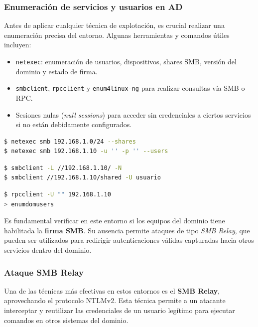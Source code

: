 \documentclass[a4paper, 11pt]{article}
\begin{document}
\subsubsection*{Enumeración de servicios y usuarios en AD}

Antes de aplicar cualquier técnica de explotación, es crucial realizar una enumeración precisa del entorno. Algunas herramientas y comandos útiles incluyen:

\begin{itemize}
\item \texttt{netexec}: enumeración de usuarios, dispositivos, shares SMB, versión del dominio y estado de firma.
\item \texttt{smbclient}, \texttt{rpcclient} y \texttt{enum4linux-ng} para realizar consultas vía SMB o RPC.
\item Sesiones nulas (\textit{null sessions}) para acceder sin credenciales a ciertos servicios si no están debidamente configurados.
\end{itemize}

\begin{lstlisting}[language=bash, style=terminalstyle, caption=Enumeración de recursos SMB con NetExec]
$ netexec smb 192.168.1.0/24 --shares
$ netexec smb 192.168.1.10 -u '' -p '' --users
\end{lstlisting}

\begin{lstlisting}[language=bash, style=terminalstyle, caption=Acceso a recursos compartidos SMB con smbclient]
$ smbclient -L //192.168.1.10/ -N
$ smbclient //192.168.1.10/shared -U usuario
\end{lstlisting}

\begin{lstlisting}[language=bash, style=terminalstyle, caption=Enumeración con rpcclient]
$ rpcclient -U "" 192.168.1.10
> enumdomusers
\end{lstlisting}

Es fundamental verificar en este entorno si los equipos del dominio tiene habilitada la \textbf{firma SMB}. Su ausencia permite ataques de tipo \textit{SMB Relay}, que pueden ser utilizados para redirigir autenticaciones válidas capturadas hacia otros servicios dentro del dominio.

\subsubsection*{Ataque SMB Relay}

Una de las técnicas más efectivas en estos entornos es el \textbf{SMB Relay}, aprovechando el protocolo NTLMv2. 
Esta técnica permite a un atacante interceptar y reutilizar las credenciales de un usuario legítimo para ejecutar comandos en otros sistemas del dominio.
\end{document}
